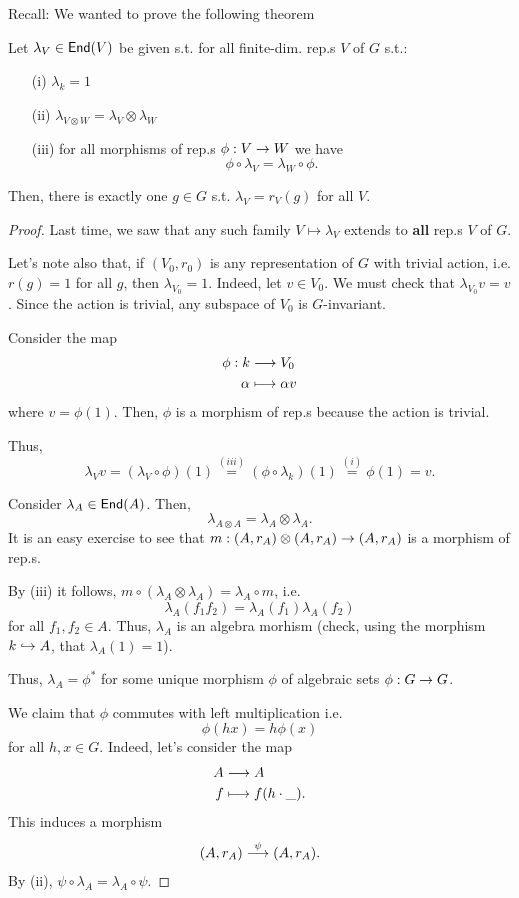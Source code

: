 Recall: We wanted to prove the following theorem
\begin{theorem}
	Let $\lambda_V \in  \textsf{End}(V)$ be given s.t. for all finite-dim. rep.s $V$ of $G$ s.t.:
	\begin{itemize}
		\item[(i)] $\lambda_k = 1$
		\item[(ii)] $\lambda_{V\otimes W} = \lambda_V \otimes \lambda_W$
		\item[(iii)] for all morphisms of rep.s $\phi :V \overset{}{\rightarrow} W$ we have
		\[ \phi \circ \lambda_V = \lambda_W \circ \phi. \]
	\end{itemize}
Then, there is exactly one $g \in G$ s.t. $\lambda_V = r_V(g)$ for all $V$.
\end{theorem}
\begin{proof}
	Last time, we saw that any such family $V \mapsto \lambda_V$ extends to \textbf{all} rep.s $V$ of $G$.
	
	Let's note also that, if $(V_0, r_0)$ is any representation of $G$ with trivial action, i.e. $r(g) = 1$ for all $g$, then $\lambda_{V_0} = 1$.
	Indeed, let $v\in V_0$. We must check that $\lambda_{V_0} v = v$. Since the action is trivial, any subspace of $V_0$ is $G$-invariant.
	
	Consider the map
	\begin{align*}
	\phi : k& \overset{}{\longrightarrow} V_0\\
	\alpha & \longmapsto \alpha v
	\end{align*}
	where $v = \phi(1)$. Then, $\phi$ is a morphism of rep.s because the action is trivial.
	
	Thus,
	\[ \lambda_Vv = (\lambda_V \circ \phi)(1) \overset{(iii)}{=} (\phi \circ \lambda_k) (1) \overset{(i)}{=} \phi(1) = v. \]
	
	Consider $\lambda_A \in \textsf{End}(A)$. Then,
	\[ \lambda_{A\otimes A} = \lambda_A \otimes \lambda_A. \]
	It is an easy exercise to see that $m : (A, r_A) \otimes (A,r_A) \overset{}{\rightarrow} (A,r_A)$ is a morphism of rep.s.
	
	By (iii) it follows, $m \circ (\lambda_A\otimes \lambda_A) = \lambda_A \circ m$, i.e.
	\[ \lambda_A(f_1f_2) = \lambda_A(f_1) \lambda_A(f_2) \]
	for all $f_1, f_2 \in A$. Thus, $\lambda_A$ is an algebra morhism (check, using the morphism $k \overset{}{\hookrightarrow} A$, that $\lambda_A(1) = 1$).
	
	Thus, $\lambda_A = \phi^*$ for some unique morphism $\phi$ of algebraic sets $\phi : G \overset{}{\rightarrow} G$.
	
	We claim that $\phi$ commutes with left multiplication i.e.
	\[ \phi(hx) = h \phi(x) \]
	for all $h,x \in G$. Indeed, let's consider the map
	\begin{align*}
	A & \overset{}{\longrightarrow} A\\
	f &\longmapsto f(h\cdot\_).
	\end{align*}
	This induces a morphism
	\begin{align*}
	(A, r_A) \overset{\psi}{\longrightarrow} (A,r_A).
	\end{align*}
	By (ii), $\psi \circ \lambda_A = \lambda_A \circ \psi$.
	

\end{proof}
